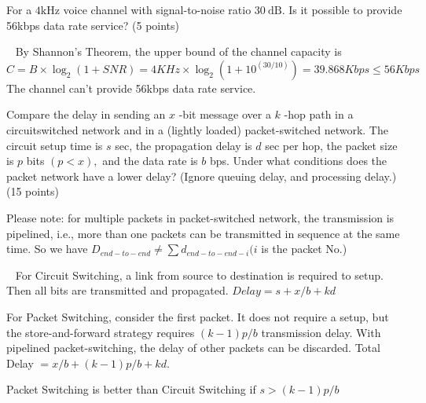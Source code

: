 \begin{exercise}[]{For a $4 \mathrm{kHz}$ voice channel with signal-to-noise ratio $30 \mathrm{~dB} .$ Is it possible to provide 56kbps data rate service? (5 points)}
  \begin{solution}
  \par{~} By Shannon's Theorem, the upper bound of the channel capacity is
  \begin{equation}
     C = B \times \log_2 (1 + SNR) = 4 KHz \times \log_2 (1 + 10^{(30/10)}) = 39.868 Kbps \le 56 Kbps
  \end{equation}
  The channel can't provide 56kbps data rate service.
  \end{solution}
  \label{ex5}
\end{exercise}


\begin{exercise}[]{Compare the delay in sending an $x$ -bit message over a $k$ -hop path in a circuitswitched network and in a (lightly loaded) packet-switched network. The circuit setup time is $s$ sec, the propagation delay is $d$ sec per hop, the packet size is $p$ bits $(p<x),$ and the data rate is $b$ bps. Under what conditions does the packet network have a lower delay? (Ignore queuing delay, and processing delay.) (15 points)
    
    Please note: for multiple packets in packet-switched network, the transmission is pipelined,
    i.e., more than one packets can be transmitted in sequence at the same time. So we have $D_{e n d-t o-e n d} \neq \sum d_{e n d-t o-e n d-i}(i$ is the packet No.)}
  \begin{solution}
  \par{~}
  For Circuit Switching, a link from source to destination is required to setup. Then all bits are transmitted and propagated. $Delay = s + x/b + kd$

  For Packet Switching, consider the first packet. It does not require a setup, but the store-and-forward strategy requires $(k - 1)p/b$ transmission delay. With pipelined packet-switching, the delay of other packets can be discarded. Total Delay $= x/b + (k - 1)p/b + kd$.

  Packet Switching is better than Circuit Switching if $s > (k-1)p/b$
  \end{solution}
  \label{ex6}
\end{exercise}